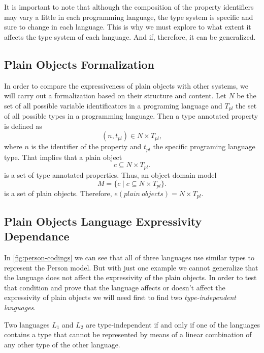 It is important to note that although the composition of the property identifiers may
vary a little in each programming language, the type system is specific and sure to
change in each language. This is why we must explore to what extent it affects the
type system of each language. And if, therefore, it can be generalized.

\subsection{Plain Objects Formalization}
In order to compare the expressiveness of plain objects with other systems, we will carry out a
formalization based on their structure and content. Let $N$ be the set of all possible variable
identificators in a programing language and $T_{pl}$ the set of all possible types in a programming
language. Then a type annotated property is defined as
\begin{equation}
(n,t_{pl}) \in N \times T_{pl},
\end{equation}
where $n$ is the identifier of the property and $t_{pl}$ the specific programing language type. That implies that a plain object
\begin{equation}
c \subseteq N \times T_{pl}.
\end{equation}
is a set of type annotated properties. Thus, an object domain model
\begin{equation}\label{eq:exp-m}
M = \{ c \mid c \subseteq N \times T_{pl} \}.
\end{equation}
is a set of plain objects. Therefore, $e(plain\ objects) = N \times T_{pl} $.

\subsection{Plain Objects Language Expressivity Dependance}
In \cref{fig:person-codings} we can see that all of three languages use similar types to represent the Person model. But with
just one example we cannot generalize that the language does not affect the expressivity of the plain objects. In order to
test that condition and prove that the language affects or doesn't affect the expressivity of plain objects we will need first
to find two \textit{type-independent languages}.

\begin{definition}
    Two languages $L_1$ and $L_2$ are type-independent if and only if one of the languages contains a type that cannot be
    represented by means of a linear combination of any other type of the other language.
\end{definition}

